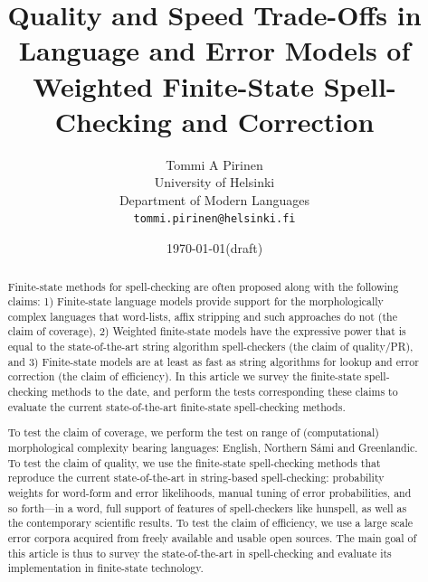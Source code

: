 \documentclass[a4paper,12pt]{article}
\title{Quality and Speed Trade-Offs in
    Language and Error Models of
    Weighted Finite-State Spell-Checking and Correction}
\author{Tommi A Pirinen\\
 [0.5cm] University of Helsinki\\ %
 Department of Modern Languages\\ %
 \texttt{tommi.pirinen@helsinki.fi}}   %
\date{\today (draft)}
\begin{document}
\ifpdf
{}
\fi

\maketitle
\thispagestyle{empty}

\begin{abstract} \noindent Finite-state methods for spell-checking are often
    proposed along with the following claims: 1) Finite-state language models
    provide support for the morphologically complex languages that word-lists,
    affix stripping and such approaches do not (the claim of coverage), 2)
    Weighted finite-state models have the expressive power that is equal to the
    state-of-the-art string algorithm spell-checkers (the claim of quality/PR),
    and 3) Finite-state models are at least as fast as string algorithms for
    lookup and error correction (the claim of efficiency).  In this article we
    survey the finite-state spell-checking methods to the date, and perform the
    tests corresponding these claims to evaluate the current state-of-the-art
    finite-state spell-checking methods.

    To test the claim of coverage, we perform the test on range of
    (computational) morphological complexity bearing languages: English,
    Northern Sámi and Greenlandic.  To test the claim of quality, we use the
    finite-state spell-checking methods that reproduce the current
    state-of-the-art in string-based spell-checking: probability weights for
    word-form and error likelihoods, manual tuning of error probabilities, and
    so forth---in a word, full support of features of spell-checkers like
    hunspell, as well as the contemporary scientific results. To test the claim
    of efficiency, we use a large scale error corpora acquired from freely
    available and usable open sources. The main goal of this article is thus to
    survey the state-of-the-art in spell-checking and evaluate its
    implementation in finite-state technology.  \end{abstract}


\makeatletter\let\chapter\@undefined\makeatother
\listoftodos
\end{document}
